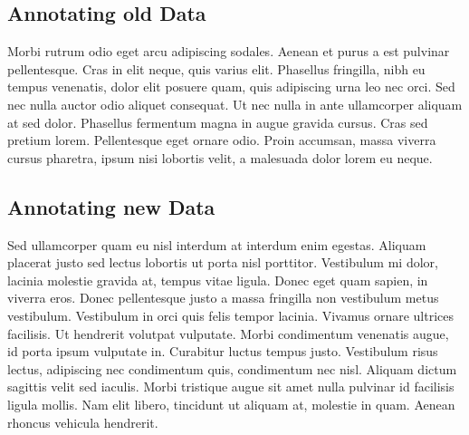 \subsection{Annotating old Data}

Morbi rutrum odio eget arcu adipiscing sodales. Aenean et purus a est
pulvinar pellentesque. Cras in elit neque, quis varius elit. Phasellus
fringilla, nibh eu tempus venenatis, dolor elit posuere quam, quis
adipiscing urna leo nec orci. Sed nec nulla auctor odio aliquet
consequat. Ut nec nulla in ante ullamcorper aliquam at sed
dolor. Phasellus fermentum magna in augue gravida cursus. Cras sed
pretium lorem. Pellentesque eget ornare odio. Proin accumsan, massa
viverra cursus pharetra, ipsum nisi lobortis velit, a malesuada dolor
lorem eu neque.


\subsection{Annotating new Data}

Sed ullamcorper quam eu nisl interdum at interdum enim
egestas. Aliquam placerat justo sed lectus lobortis ut porta nisl
porttitor. Vestibulum mi dolor, lacinia molestie gravida at, tempus
vitae ligula. Donec eget quam sapien, in viverra eros. Donec
pellentesque justo a massa fringilla non vestibulum metus
vestibulum. Vestibulum in orci quis felis tempor lacinia. Vivamus
ornare ultrices facilisis. Ut hendrerit volutpat vulputate. Morbi
condimentum venenatis augue, id porta ipsum vulputate in. Curabitur
luctus tempus justo. Vestibulum risus lectus, adipiscing nec
condimentum quis, condimentum nec nisl. Aliquam dictum sagittis velit
sed iaculis. Morbi tristique augue sit amet nulla pulvinar id
facilisis ligula mollis. Nam elit libero, tincidunt ut aliquam at,
molestie in quam. Aenean rhoncus vehicula hendrerit.
